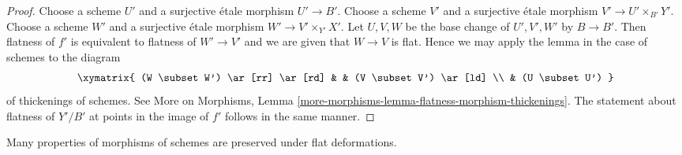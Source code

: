 \begin{proof}
Choose a scheme $U'$ and a surjective \'etale morphism $U' \to B'$.
Choose a scheme $V'$ and a surjective \'etale morphism
$V' \to U' \times_{B'} Y'$.
Choose a scheme $W'$ and a surjective \'etale morphism
$W' \to V' \times_{Y'} X'$. Let $U, V, W$ be the base change
of $U', V', W'$ by $B \to B'$. Then flatness of $f'$ is
equivalent to flatness of $W' \to V'$ and we are
given that $W \to V$ is flat. Hence we may apply the lemma
in the case of schemes to the diagram
$$
\xymatrix{
(W \subset W') \ar[rr] \ar[rd] & & (V \subset V') \ar[ld] \\
& (U \subset U')
}
$$
of thickenings of schemes. See
More on Morphisms, Lemma
\ref{more-morphisms-lemma-flatness-morphism-thickenings}.
The statement about flatness of $Y'/B'$ at points in the
image of $f'$ follows in the same manner.
\end{proof}

\noindent
Many properties of morphisms of schemes are preserved under flat
deformations.

